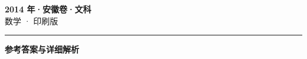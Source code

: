 \documentclass[zihao=5, a4paper]{ctexart}
\begin{document}
\begin{center}
  {\Large\bfseries 2014 年·安徽卷·文科}\\[4pt]
  {\large 数学 · 印刷版}
\end{center}
\medskip
{}

\par\bigskip\hrule\bigskip
{}
\Needspace{0.55\textheight}
\begin{center}{\large\bfseries 参考答案与详细解析}\end{center}
\smallskip

\end{document}
